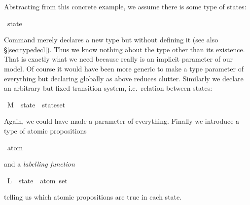 \begin{isabellebody}
\begin{isamarkuptext}
Abstracting from this concrete example, we assume there is some type of
states:%
\end{isamarkuptext}%
\ state%
\begin{isamarkuptext}%
\noindent
Command  merely declares a new type but without
defining it (see also \S\ref{sec:typedecl}). Thus we know nothing
about the type other than its existence. That is exactly what we need
because  really is an implicit parameter of our model.  Of
course it would have been more generic to make  a type
parameter of everything but declaring  globally as above
reduces clutter.  Similarly we declare an arbitrary but fixed
transition system, i.e.\ relation between states:%
\end{isamarkuptext}%
\ M\ {\isacharcolon}{\isacharcolon}\ {\isachardoublequote}{\isacharparenleft}state\ {\isasymtimes}\ state{\isacharparenright}set{\isachardoublequote}%
\begin{isamarkuptext}%
\noindent
Again, we could have made  a parameter of everything.
Finally we introduce a type of atomic propositions%
\end{isamarkuptext}%
\ atom%
\begin{isamarkuptext}%
\noindent
and a \emph{labelling function}%
\end{isamarkuptext}%
\ L\ {\isacharcolon}{\isacharcolon}\ {\isachardoublequote}state\ {\isasymRightarrow}\ atom\ set{\isachardoublequote}%
\begin{isamarkuptext}%
\noindent
telling us which atomic propositions are true in each state.%
\end{isamarkuptext}%
\end{isabellebody}%
